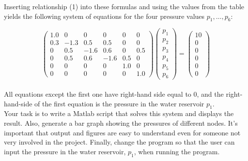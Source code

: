 \documentclass[11pt,a4paper]{article}
\begin{document}
\noindent Inserting relationship (1) into these formulas and using the values from the table yields the following system of equations for the four pressure values  $p_1,\ldots, p_6$:

\begin{equation}
\left(\begin{array}{cccccc}
    1.0   &0        & 0      &   0      &   0    & 0     \\
    0.3   & -1.3  &  0.5  &   0.5   &   0    & 0     \\
    0      &   0.5  & -1.6  &  0.6   &   0    & 0.5  \\
    0      &   0.5  &   0.6 & -1.6   &   0.5 & 0     \\
  0        &   0     &   0     &   0      &  1.0  & 0     \\
  0        &   0     &   0     &   0     &   0     & 1.0 
 \end{array}\right)
\left(\begin{array}{c} 
p_1  \\ 
p_2  \\
p_3  \\ 
p_4  \\
p_5   \\
p_6
\end{array}\right) =
\left(\begin{array}{c} 
10 \\
0    \\
0    \\
0    \\
0    \\
0
\end{array}\right)
\label{eq:matsys}
\end{equation}\\
\noindent All equations except the first one have right-hand side equal to 0, and the right-hand-side of the first equation is the pressure in the water reservoir $p_1$.
\\

\noindent Your task is to write a Matlab script that solves this system and displays the result. Also, generate a bar graph showing the pressures of different nodes. It's important that output and figures are easy to understand even for someone not very involved in the project. Finally, change the program so that the user can input the pressure in the water reservoir, $p_1$, when running the program.   
\end{document}
